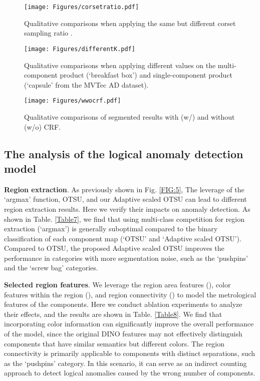 \documentclass[final,5p,times,twocolumn]{elsarticle}
\begin{document}
\begin{figure}
\centering
		\texttt{[image: Figures/corsetratio.pdf]}\caption{Qualitative comparisons when applying the same  but different corset sampling ratio . }
	\label{FIG:13}
\end{figure}

\begin{figure}
\centering
		\texttt{[image: Figures/differentK.pdf]}\caption{Qualitative comparisons when applying different  values on the multi-component product (`breakfast box') and single-component product (`capsule' from the MVTec AD dataset).}
	\label{FIG:14}
\end{figure}

\begin{figure}
\centering
		\texttt{[image: Figures/wwocrf.pdf]}\caption{Qualitative comparisons of segmented results with (w/) and without (w/o) CRF.}
	\label{FIG:15}
\end{figure}



\subsection{The analysis of the logical anomaly detection model}
\label{5.4}
\textbf{Region extraction}. As previously shown in Fig. \ref{FIG:5}, The leverage of the `argmax' function, OTSU, and our Adaptive scaled OTSU can lead to different region extraction results. Here we verify their impacts on anomaly detection. As shown in Table. \ref{Table7}, we find that using multi-class competition for region extraction (`argmax') is generally suboptimal compared to the binary classification of each component map (`OTSU' and `Adaptive scaled OTSU'). Compared to OTSU, the proposed Adaptive scaled OTSU improves the performance in categories with more segmentation noise, such as the `pushpins' and the `screw bag' categories.

\textbf{Selected region features}. We leverage the region area features (), color features within the region (), and region connectivity () to model the metrological features of the components. Here we conduct ablation experiments to analyze their effects, and the results are shown in Table. \ref{Table8}. We find that incorporating color information can significantly improve the overall performance of the model, since the original DINO features may not effectively distinguish components that have similar semantics but different colors. The region connectivity is primarily applicable to components with distinct separations, such as the `pushpins' category. In this scenario, it can serve as an indirect counting approach to detect logical anomalies caused by the wrong number of components.
\end{document}
